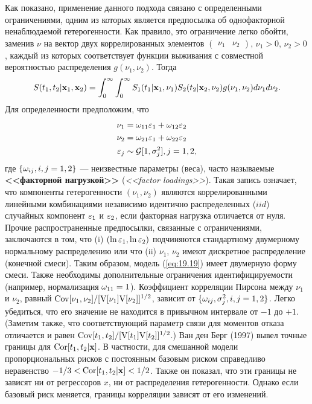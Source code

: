 Как показано, применение данного подхода связано с определенными ограничениями, одним из которых является предпосылка об однофакторной ненаблюдаемой гетерогенности. Как правило, это ограничение легко обойти, заменив $\nu$ на вектор двух коррелированных элементов $\begin{pmatrix} \nu_1 & \nu_2 \end{pmatrix}$, $\nu_1 > 0$, $\nu_2 > 0$, каждый из которых соответствует функции выживания с совместной вероятностью распределения $g(\nu_1, \nu_2)$. Тогда
    \begin{align}\label{eq:19.19}
    S(t_1, t_2|\mathbf{x}_1, \mathbf{x}_2) = \int^{\infty}_{0} \int^{\infty}_{0} S_1(t_1|\mathbf{x}_1, \nu_1) S_2(t_2|\mathbf{x}_2, \nu_2) g(\nu_1, \nu_2) d\nu_1 d\nu_2.
    \end{align}
Для определенности предположим, что
    \begin{align}
    \nu_1           &= \omega_{11}\varepsilon_1 + \omega_{12}\varepsilon_2 \notag \\
    \nu_2           &= \omega_{21}\varepsilon_1 + \omega_{22}\varepsilon_2 \notag \\
    \varepsilon_j   &\sim \mathcal G[1,\sigma^{2}_{j}] , j=1,2, \notag
    \end{align}
где $\{\omega_{ij}, i, j = 1, 2\}$ --- неизвестные параметры (веса), часто называемые \textbf{<<факторной нагрузкой>>} (\textit{<<factor loadings>>}). Такая запись означает, что компоненты гетерогенности $(\nu_1, \nu_2)$ являются коррелированными линейными комбинациями независимо идентично распределенных ($iid$) случайных компонент $\varepsilon_1$ и $\varepsilon_2$, если факторная нагрузка отличается от нуля. Прочие распространенные предпосылки, связанные с ограничениями, заключаются в том, что (i) $(\ln\varepsilon_1, \ln\varepsilon_2)$ подчиняются стандартному двумерному нормальному распределению или что (ii) $\nu_1$, $\nu_2$ имеют дискретное распределение (конечной смеси). Таким образом, модель (\ref{eq:19.19}) имеет двумерную форму смеси. Также необходимы дополнительные ограничения идентифицируемости (например, нормализация $\omega_{11} = 1$). Коэффициент корреляции Пирсона между $\nu_1$ и $\nu_2$, равный $\mathrm{Cov}[\nu_1, \nu_2]/[\mathrm{V}[\nu_1]\mathrm{V}[\nu_2]]^{1/2}$, зависит от $\{\omega_{ij}, \sigma^2_j, i, j = 1, 2\}$. Легко убедиться, что его значение не находится в привычном интервале от $-1$ до $+1$. (Заметим также, что соответствующий параметр связи для моментов отказа отличается и равен $\mathrm{Cov}[t_1, t_2]/[\mathrm{V}[t_1]\mathrm{V}[t_2]]^{1/2}$.) Ван ден Берг (1997) вывел точные границы для $\mathrm{Cor}[t_1, t_2|\mathbf{x}]$. В частности, для смешанной модели пропорциональных рисков с постоянным базовым риском справедливо неравенство $-1/3 < \mathrm{Cor}[t_1, t_2|\mathbf{x}] < 1/2$. Также он показал, что эти границы не зависят ни от регрессоров $x$, ни от распределения гетерогенности. Однако если базовый риск меняется, границы корреляции зависят от его изменений.

